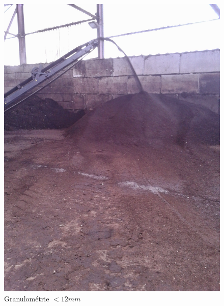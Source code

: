 \documentclass{article}
\begin{document}
\begin{figure}
  \centering
  \includegraphics[scale=0.07]{IMG_20141105_103027.jpg}
  \caption{Granulométrie $< \unit{12}{mm}$}
  \label{fig:Granu12}
\end{figure}
\end{document}
